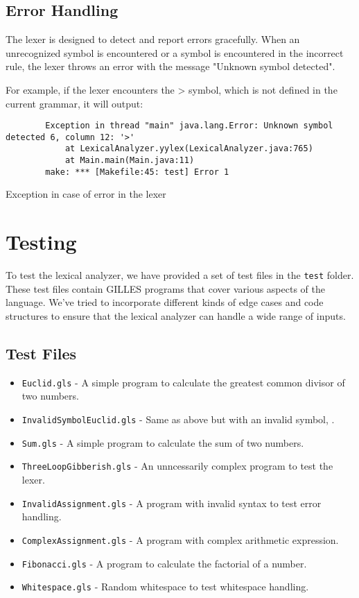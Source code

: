 	\subsection{Error Handling}

	The lexer is designed to detect and report errors gracefully. When an unrecognized symbol is encountered or a symbol is encountered in the incorrect rule, the lexer throws an error with the message "Unknown symbol detected".

	For example, if the lexer encounters the > symbol, which is not defined in the current grammar, it will output:

	\begin{verbatim}
		Exception in thread "main" java.lang.Error: Unknown symbol detected 6, column 12: '>'
			at LexicalAnalyzer.yylex(LexicalAnalyzer.java:765)
			at Main.main(Main.java:11)
		make: *** [Makefile:45: test] Error 1
	\end{verbatim}

    \begin{table}[h]
		\centering
		\caption{Exception in case of error in the lexer}
	\end{table}

	\section{Testing}
	To test the lexical analyzer, we have provided a set of test files in the \texttt{test} folder. These test files contain GILLES programs that cover various aspects of the language.
	We've tried to incorporate different kinds of edge cases and code structures to ensure that the lexical analyzer can handle a wide range of inputs.
	\subsection{Test Files}
	\begin{itemize}
		\item \texttt{Euclid.gls} - A simple program to calculate the greatest common divisor of two numbers.
		\item \texttt{InvalidSymbolEuclid.gls} - Same as above but with an invalid symbol, .
		\item \texttt{Sum.gls} - A simple program to calculate the sum of two numbers.
		\item \texttt{ThreeLoopGibberish.gls} - An unncessarily complex program to test the lexer.
		\item \texttt{InvalidAssignment.gls} - A program with invalid syntax to test error handling.
		\item \texttt{ComplexAssignment.gls} - A program with complex arithmetic expression.
		\item \texttt{Fibonacci.gls} - A program to calculate the factorial of a number.
		\item \texttt{Whitespace.gls} - Random whitespace to test whitespace handling.
	\end{itemize}

